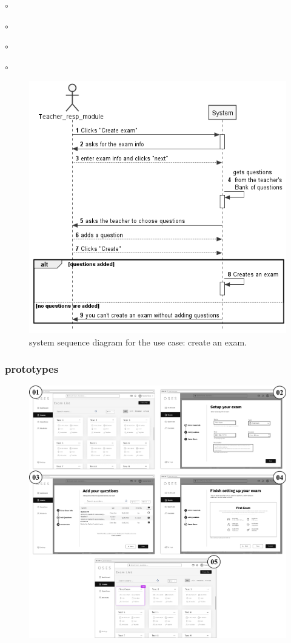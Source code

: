 \documentclass[]{uc2pfecaneva}
\begin{document}
\begin{list}{$\circ$}{}
\begin{list}{$\circ$}{}
\begin{list}{$\circ$}{}
\begin{list}{$\circ$}{}
\begin{figure}[h]
        \centering
        \includegraphics[width=\textwidth]{images/Create_Exam}

        \caption{system sequence diagram for the use case: create an exam.}
    \end{figure}
    \clearpage

    \subsubsection{prototypes}
    \begin{figure}[h]

        \centering
        \includegraphics[width=\textwidth]{images/prototypes_create_exam}


\end{figure}
\end{list}
\end{list}
\end{list}
\end{list}
\end{document}
